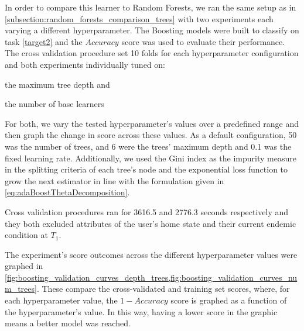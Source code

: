 In order to compare this learner to Random Forests, we ran the same setup as in \cref{subsection:random_forests_comparison_trees}
with two experiments each varying a different hyperparameter.
The Boosting models were built to classify on task \cref{target2} and the $Accuracy$ score was used to evaluate their performance.
The cross validation procedure set 10 folds for each hyperparameter
 configuration and both experiments individually tuned on:
\begin{enumerate*}[label={\alph*)},]
\item the maximum tree depth and
\item the number of base learners
\end{enumerate*}

For both, we vary the tested hyperparameter's values over a predefined range and then graph the change in score across these values.
As a default configuration, 50 was the number of trees, and 6 were the trees' maximum depth and 0.1 was the fixed learning rate.
Additionally, we used the Gini index as the impurity measure in the splitting criteria of each tree's node and the exponential loss function to grow the next estimator in line with the formulation given in \cref{eq:adaBoostThetaDecomposition}.

Cross validation procedures ran for 3616.5 and 2776.3 seconds respectively and they both excluded attributes of the user's home state and their current endemic condition at $T_1$.

The experiment's score outcomes across the different hyperparameter values were graphed in \cref{fig:boosting_validation_curves_depth_trees,fig:boosting_validation_curves_num_trees}.
These compare the cross-validated and training set scores, where, for each hyperparameter value, the $1 - Accuracy$ score is graphed as a function of the hyperparameter's value.
In this way, having a lower score in the graphic means a better model was reached.

